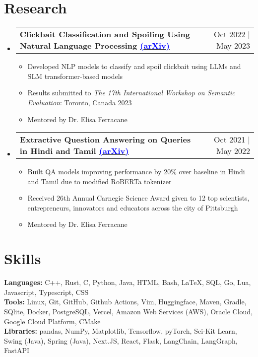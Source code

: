 \documentclass{article}
\makeatletter
\newcommand{\resumeItem}[1]{
  \item\small{
    {#1 \vspace{-2pt}}
  }
}
\newcommand{\resumeProjectHeading}[2]{
    \item
    \begin{tabular*}{0.97\textwidth}{l@{\extracolsep{\fill}}r}
      \small#1 & #2 \\
    \end{tabular*}\vspace{-7pt}
}
\newcommand{\resumeSubHeadingListStart}{\begin{itemize}[leftmargin=0.15in, label={}]}
\newcommand{\resumeSubHeadingListEnd}{\end{itemize}}
\newcommand{\resumeItemListStart}{\begin{itemize}}
\newcommand{\resumeItemListEnd}{\end{itemize}\vspace{-5pt}}
\makeatother
\begin{document}
\section{Research}
\resumeSubHeadingListStart
\resumeProjectHeading
{\textbf{Clickbait Classification and Spoiling Using Natural Language Processing \href{https://doi.org/10.48550/arXiv.2306.14907}{\textcolor{blue}{(arXiv)}}}} {Oct 2022 | May 2023}
\resumeItemListStart
\resumeItem{Developed NLP models to classify and spoil clickbait using LLMs and SLM transformer-based models}
\resumeItem{Results submitted to \textit{The 17th International Workshop on Semantic Evaluation}: Toronto, Canada 2023}
\resumeItem{Mentored by Dr. Elisa Ferracane}
\resumeItemListEnd

\resumeProjectHeading
{\textbf{Extractive Question Answering on Queries in Hindi and Tamil \href{https://doi.org/10.48550/arXiv.2210.06356}{\textcolor{blue}{(arXiv)}}}}{Oct 2021 | May 2022}
\resumeItemListStart
\resumeItem{Built QA models improving performance by 20\% over baseline in Hindi and Tamil due to modified RoBERTa tokenizer}
\resumeItem{Received 26th Annual Carnegie Science Award given to 12 top scientists, entrepreneurs, innovators and educators across the city of Pittsburgh}
\resumeItem{Mentored by Dr. Elisa Ferracane}
\resumeItemListEnd

\resumeSubHeadingListEnd

\vspace{-10pt}
\section{Skills}
\begin{itemize}[leftmargin=0.15in, label={}]
	\small{\item{

		            \textbf{Languages:}{ C++, Rust, C, Python, Java, HTML, Bash, \LaTeX, SQL, Go, Lua, Javascript, Typescript, CSS} \\
                \textbf{Tools:}{ Linux, Git, GitHub, Github Actions, Vim, Huggingface, Maven, Gradle, SQlite, Docker, PostgreSQL, Vercel, Amazon Web Services (AWS), Oracle Cloud, Google Cloud Platform, CMake}\\
		            \textbf{Libraries:}{ pandas, NumPy, Matplotlib, Tensorflow, pyTorch, Sci-Kit Learn, Swing (Java), Spring (Java), Next.JS, React, Flask, LangChain, LangGraph, FastAPI}

		      }}
\end{itemize}
\vspace{-10pt}
\end{document}
